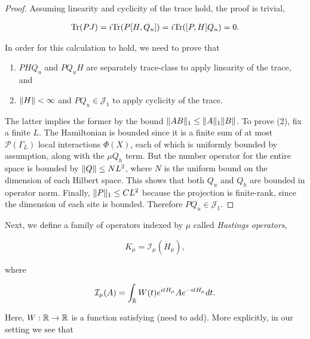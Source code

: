 \documentclass[12pt, letterpaper]{article}
\begin{document}
\begin{proof}
Assuming linearity and cyclicity of the trace hold, the proof is trivial, 

\[\begin{aligned}
\text{Tr}(P J) = i\text{Tr}(P [H,Q_u]) = i\text{Tr}([P,H]Q_u) = 0.
\end{aligned}\]

In order for this calculation to hold, we need to prove that

\begin{enumerate}
\item $P H Q_u$ and $P Q_u H$ are separately trace-class to apply linearity of the trace, and 
\item $\lVert H \rVert<\infty$ and $P Q_u \in \mathcal{J}_1$ to apply cyclicity of the trace. 
\end{enumerate}

The latter implies the former by the bound $\lVert AB \rVert_1 \leq \lVert A \rVert_1\lVert B \rVert$.  To prove (2), fix a finite $L$. The Hamiltonian is bounded since it is a finite sum of at most $\mathcal{P}(\Gamma_L)$ local interactions $\Phi(X)$, each of which is uniformly bounded by assumption, along with the $\mu Q_h$ term. But the number operator for the entire space is bounded by $\lVert Q \rVert \leq NL^2$, where $N$ is the uniform bound on the dimension of each Hilbert space. This shows that both $Q_u$ and $Q_h$ are bounded in operator norm. Finally, $\lVert P \rVert_1\leq CL^2$ because the projection is finite-rank, since the dimension of each site is bounded. Therefore $P Q_u \in \mathcal{J}_1$.

\end{proof}

Next, we define a family of operators indexed by $\mu$ called \emph{Hastings operators},

\[K_\mu = \mathcal{I}_{\mu}(\dot{H}_\mu),\]

where 

\[\mathcal{I}_{\mu} (A) = \int_{\mathbb{R}} W(t) e^{itH_\mu} A e^{-itH_\mu}dt.\]

Here, $W:\mathbb{R}\to\mathbb{R}$ is a function satisfying (need to add). More explicitly, in our setting we see that 
\end{document}
